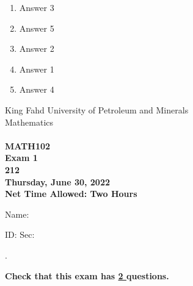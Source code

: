 \documentclass[amsfonts,bezier,leqno,fleqn,12pt,a4paper]{article}
\begin{document}
{{\begin{large}
\begin{enumerate}
\begin{enumerate}
\item  Answer 3
\item  Answer 5
\item  Answer 2
\item  Answer 1
\item  Answer 4

\end{enumerate}
\newpage


\end{enumerate}
\end{large}


\newpage


\thispagestyle{empty}
\begin{center}
    \begin{large}
        King Fahd University of Petroleum and Minerals \\ 
        Mathematics  \\ 
        \vspace*{4.5cm}
        {\bf {} }  \hfill {\bf {}} \\
        {\bf MATH102 }  \\
        {\bf Exam 1 }  \\
        {\bf 212 }  \\
        {\bf Thursday, June 30, 2022 }  \\ 
        {\bf Net Time Allowed: Two Hours }  \\
        \vspace*{0.2cm}

    \end{large}
\end{center}

\large{Name:  }\hrulefill

\vspace{3mm}

\large{ID: } \hrulefill \large{  Sec: } \hrulefill \large{.

\vspace{1cm}

\large{\bf{Check that this exam has {\underline{ 2 }} questions.}}

\vspace{1cm}

}}}
\end{document}
